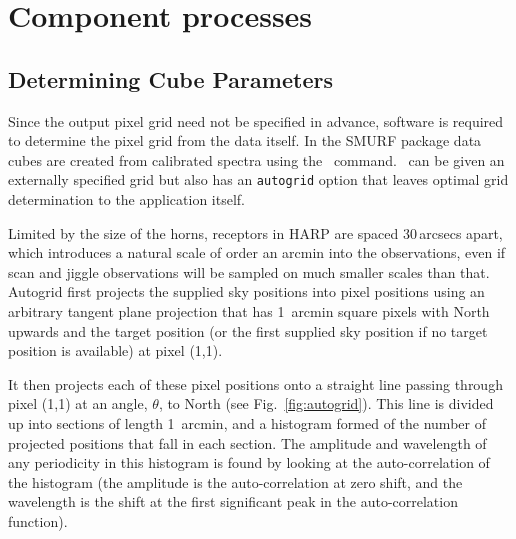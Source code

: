 \documentclass[final,authoryear,5p,times,twocolumn]{elsarticle}
\begin{document}
\section{Component processes}

\subsection{Determining Cube Parameters}
\label{sec:makecube}

Since the output pixel grid need not be specified in advance, software
is required to determine the pixel grid from the data itself. In the
SMURF package data cubes are created from calibrated spectra using the
\makecube\ command. \makecube\ can be given an externally specified
grid but also has an \texttt{autogrid} option that leaves optimal grid
determination to the application itself.

Limited by the size of the horns, receptors in HARP are spaced
30\,arcsecs apart, which introduces a natural scale of order an arcmin
into the observations, even if scan and jiggle observations will be
sampled on much smaller scales than that. Autogrid first projects the
supplied sky positions into pixel positions using an arbitrary tangent
plane projection that has 1~arcmin square pixels with North upwards
and the target position (or the first supplied sky position if no
target position is available) at pixel (1,1).

It then projects each of these pixel positions onto a straight line
passing through pixel (1,1) at an angle, $\theta$, to North (see
Fig.~\ref{fig:autogrid}). This line is divided up into sections of
length 1~arcmin, and a histogram formed of the number of projected
positions that fall in each section. The amplitude and wavelength of
any periodicity in this histogram is found by looking at the
auto-correlation of the histogram (the amplitude is the
auto-correlation at zero shift, and the wavelength is the shift at the
first significant peak in the auto-correlation function).
\end{document}
